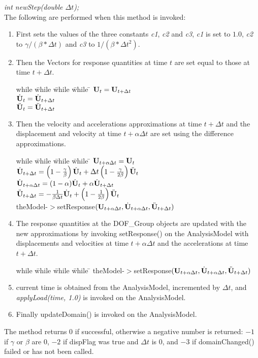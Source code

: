 {\em int newStep(double $\Delta t$);}\\
The following are performed when this method is invoked:
\begin{enumerate}
\item First sets the values of the three constants {\em c1}, {\em c2}
and {\em c3}, {\em c1} is set to $1.0$, {\em c2} to $
\gamma / (\beta * \Delta t)$ and {\em c3} to $1/ (\beta * \Delta t^2)$.
\item Then the Vectors for response quantities at time $t$ are set
equal to those at time $t + \Delta t$.
\begin{tabbing}
while \= while \= while \= while \= \kill
\>\> $ {\bf U}_t = {\bf U}_{t + \Delta t}$ \\
\>\> $ \dot{\bf U}_t = \dot{\bf U}_{t + \Delta t} $ \\
\>\> $ \ddot{\bf U}_t = \ddot{\bf U}_{t + \Delta t} $ 
\end{tabbing}
\item Then the velocity and accelerations approximations at time $t +
\Delta t$ and the displacement and velocity at time $t + \alpha \Delta t$
are set using the difference approximations.
\begin{tabbing}
while \= while \= while \= while \= \kill
\>\> $ {\bf U}_{t + \alpha \Delta t} = {\bf U}_t$ \\
\>\> $ \dot {{\bf U}}_{t + \Delta t} = 
 \left( 1 - \frac{\gamma}{\beta}\right) \dot {{\bf U}}_t + \Delta t \left(1
- \frac{\gamma}{2 \beta}\right) \ddot {{\bf U}}_t $ \\
\>\> $ \dot{\bf U}_{t + \alpha \Delta t} = (1 - \alpha) \dot{\bf U}_t + \alpha \dot{\bf U}_{t +
\Delta t}$ \\
\>\> $ \ddot {{\bf U}}_{t + \Delta t} = 
 - \frac{1}{\beta \Delta t} \dot {{\bf U}}_t + \left( 1 - \frac{1}{2
\beta} \right) \ddot {{\bf U}}_t  $ \\
\>\> theModel-$>$setResponse$({\bf U}_{t + \alpha \Delta t}, \dot{\bf U}_{t+\alpha
\Delta t}, \ddot{\bf U}_{t+\Delta t})$ 
\end{tabbing}
\item The response quantities at the DOF\_Group objects are updated
with the new approximations by invoking setResponse() on the
AnalysisModel with displacements and velocities at time $t + \alpha
\Delta t$ and the accelerations at time $t + \Delta t$.
\begin{tabbing}
while \= while \= while \= while \= \kill
\>\> theModel-$>$setResponse$({\bf U}_{t + \alpha \Delta t}, \dot{\bf U}_{t+\alpha
\Delta t}, \ddot{\bf U}_{t+\Delta t})$ 
\end{tabbing}
\item current time is obtained from the AnalysisModel, incremented by
$\Delta t$, and {\em applyLoad(time, 1.0)} is invoked on the
AnalysisModel. 
\item Finally updateDomain() is invoked on the AnalysisModel.
\end{enumerate}
The method returns $0$ if successful, otherwise a negative number is
returned: $-1$ if $\gamma$ or $\beta$ are $0$, $-2$ if \p dispFlag
was true and $\Delta t$ is $0$, and $-3$ if domainChanged()
failed or has not been called. \\



